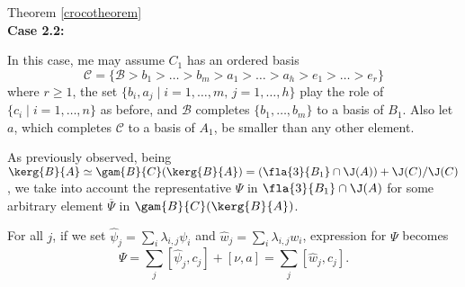 \begin{proofof}{Theorem \ref{crocotheorem}}
\\[+0.5mm]\noindent
{\bf Case 2.2:}

\medskip
In this case, me may assume $C_{1}$ has an ordered basis
$$\mathcal{C}=\{\mathcal{B}>b_{1}>\dots>b_{m}>a_{1}>\dots>a_{h}>e_{1}>\dots>e_{r}\}$$
where $r\geq1$, the set $\{b_{i},a_{j}\mid i=1,\dots,m,\,j=1,\dots,h\}$ play the role of $\{c_{i}\mid i=1,\dots,n\}$ as before, and $\mathcal{B}$ completes $\{b_{1},\dots,b_{m}\}$ to a basis of $B_{1}$. Also let $a$,
which completes $\mathcal{C}$ to a basis of $A_{1}$, be smaller than any other element.

\medskip
As previously observed, being $\kerg{B}{A}\simeq\gam{B}{C}(\kerg{B}{A})=(\fla{3}{B_{1}}\cap\J(A))+\J(C)/\J(C)$,
we take into account the representative $\Psi$ in $\fla{3}{B_{1}}\cap\J(A)$ for some
arbitrary element $\overline{\Psi}$ in $\gam{B}{C}(\kerg{B}{A})$.

For all $j$, if we set $\hat\psi_{j}=\sum_{i}\lambda_{i,j}\psi_{i}$
and $\hat w_{j}=\sum_{i}\lambda_{i,j}w_{i}$, expression  for $\Psi$ becomes
$$\Psi=\sum_{j}[\hat\psi_{j},c_{j}]+[\nu,a]=\sum_{j}[\hat w_{j},c_{j}].$$


\end{proofof}

